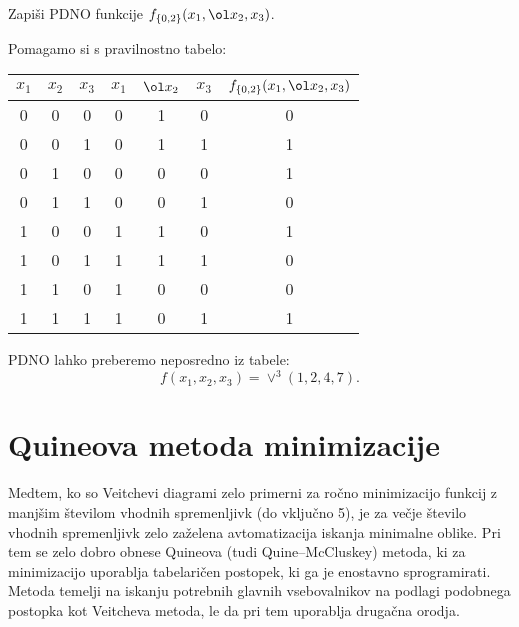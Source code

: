 \bigskip
\begin{zgled} 
Zapiši PDNO funkcije $f_{\{0,2\}}(x_1,\ol x_2,x_3)$.
\end{zgled}
\begin{resitev}
Pomagamo si s pravilnostno tabelo:

\begin{tabular}{ccc|ccc|c}
$x_1$ & $x_2$ & $x_3$ & $x_1$ & $\ol x_2$ & $x_3$ & $f_{\{0,2\}}(x_1,\ol x_2,x_3)$ \\
\hline
0 & 0 & 0 & 0 & 1 & 0 & 0 \\
0 & 0 & 1 & 0 & 1 & 1 & 1 \\
0 & 1 & 0 & 0 & 0 & 0 & 1 \\
0 & 1 & 1 & 0 & 0 & 1 & 0 \\
1 & 0 & 0 & 1 & 1 & 0 & 1 \\
1 & 0 & 1 & 1 & 1 & 1 & 0 \\
1 & 1 & 0 & 1 & 0 & 0 & 0 \\
1 & 1 & 1 & 1 & 0 & 1 & 1 \\
\end{tabular}

PDNO lahko preberemo neposredno iz tabele:
$$f(x_1,x_2,x_3) = \vee^3(1,2,4,7).$$
\end{resitev}


\section{Quineova metoda minimizacije}
Medtem, ko so Veitchevi diagrami zelo primerni za ročno minimizacijo funkcij z manjšim številom vhodnih spremenljivk (do vključno 5), je za večje število vhodnih spremenljivk zelo zaželena avtomatizacija iskanja minimalne oblike. Pri tem se zelo dobro obnese Quineova (tudi Quine–McCluskey) metoda, ki za minimizacijo uporablja tabelaričen postopek, ki ga je enostavno sprogramirati. Metoda temelji na iskanju potrebnih glavnih vsebovalnikov na podlagi podobnega postopka kot Veitcheva metoda, le da pri tem uporablja drugačna orodja.

